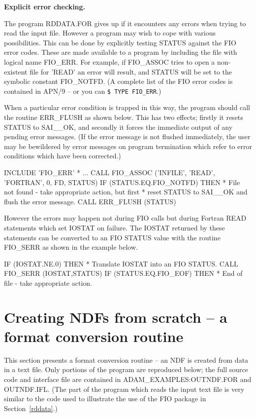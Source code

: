 \documentclass[twoside,11pt,nolof]{starlink}
\begin{document}
{\bigskip\large\bf Explicit error checking.}

The program RDDATA.FOR gives up if it encounters any errors when trying to
read the input file.
However a program may wish to cope with various possibilities.
This can be done by explicitly testing STATUS against the FIO error codes.
These are made available to a program by including the file with
logical name FIO\_ERR.
For example, if FIO\_ASSOC tries to open a non-existent file for 'READ'
an error will result, and STATUS will be set to the symbolic constant
FIO\_NOTFD.
(A complete list of the FIO error codes is contained in APN/9
-- or you can \texttt{\$ TYPE FIO\_ERR}.)

When a particular error condition is trapped in this way, the program
should call the routine ERR\_FLUSH as shown below. This has two effects;
firstly it resets STATUS
to SAI\_\_OK, and secondly it forces the immediate output of any pending
error messages. (If the error message is not flushed immediately, the user
may be bewildered by error messages on program termination which refer to
error conditions which have been corrected.)
\begin{terminalv}
      INCLUDE 'FIO_ERR'
*     ...
      CALL FIO_ASSOC ('INFILE', 'READ', 'FORTRAN', 0, FD, STATUS)
      IF (STATUS.EQ.FIO_NOTFD) THEN
*      File not found - take appropriate action, but first
*      reset STATUS to SAI__OK and flush the error message.
         CALL ERR_FLUSH (STATUS)
\end{terminalv}
However the errors may happen not during FIO calls
but during Fortran READ statements which set
IOSTAT on failure.
The IOSTAT returned by these statements can be converted to an FIO STATUS
value with the routine FIO\_SERR as shown in the example below.
\begin{terminalv}
      IF (IOSTAT.NE.0) THEN
*      Translate IOSTAT into an FIO STATUS.
         CALL FIO_SERR (IOSTAT,STATUS)
         IF (STATUS.EQ.FIO_EOF) THEN
*         End of file - take appropriate action.
\end{terminalv}

\newpage
\section{Creating NDFs from scratch -- a format conversion routine\label{outndf}}

This section presents a format conversion routine --
an NDF is created from data in a text file.
Only portions of the program are reproduced below;
the full source code and interface file are contained in
ADAM\_EXAMPLES:OUTNDF.FOR and OUTNDF.IFL.
(The part of the program which reads the input text file is very similar
to the code used to illustrate the use of the FIO package
in Section~\ref{rddata}.)
\end{document}
